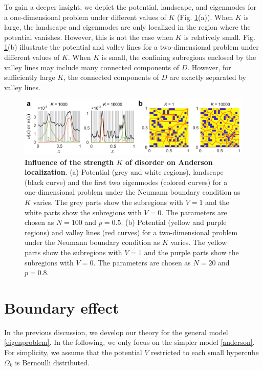 \documentclass[a4paper,11pt]{article}
\begin{document}
To gain a deeper insight, we depict the potential, landscape, and eigenmodes for a one-dimensional problem under different values of $K$ (Fig. \ref{fig2}(a)). When $K$ is large, the landscape and eigenmodes are only localized in the region where the potential vanishes. However, this is not the case when $K$ is relatively small. Fig. \ref{fig2}(b) illustrate the potential and valley lines for a two-dimensional problem under different values of $K$. When $K$ is small, the confining subregions enclosed by the valley lines may include many connected components of $D$. However, for sufficiently large $K$, the connected components of $D$ are exactly separated by valley lines.
\begin{figure}
\centering
\includegraphics[width=\linewidth]{Fig2}
\caption{\textbf{Influence of the strength $K$ of disorder on Anderson localization}. (a) Potential (grey and white regions), landscape (black curve) and the first two eigenmodes (colored curves) for a one-dimensional problem under the Neumann boundary condition as $K$ varies. The grey parts show the subregions with $V=1$ and the white parts show the subregions with $V=0$. The parameters are chosen as $N=100$ and $p=0.5$. (b) Potential (yellow and purple regions) and valley lines (red curves) for a two-dimensional problem under the Neumann boundary condition as $K$ varies. The yellow parts show the subregions with $V = 1$ and the purple parts show the subregions with $V = 0$. The parameters are chosen as $N=20$ and $p=0.8$.}
\label{fig2}
\end{figure}


\section{Boundary effect}\label{boundary}
In the previous discussion, we develop our theory for the general model \eqref{eigenproblem}. In the following, we only focus on the simpler model \eqref{anderson}. For simplicity, we assume that the potential $V$ restricted to each small hypercube $\Omega_k$ is Bernoulli distributed.
\end{document}
